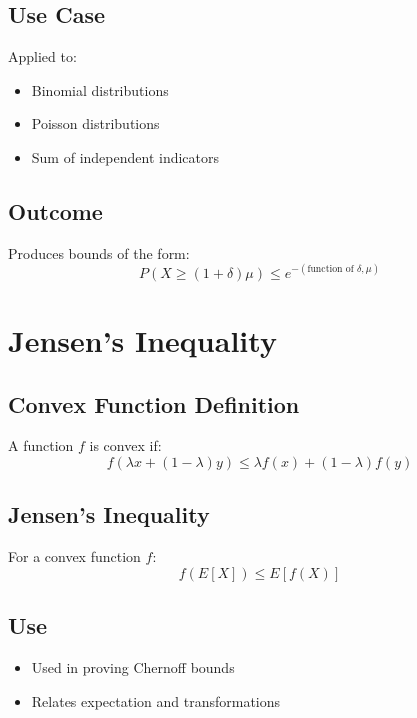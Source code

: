 \documentclass{article}
\begin{document}
\subsection{Use Case}

Applied to:
\begin{itemize}
    \item Binomial distributions
    \item Poisson distributions
    \item Sum of independent indicators
\end{itemize}

\subsection{Outcome}

Produces bounds of the form:
\begin{equation}
P(X \geq (1 + \delta)\mu) \leq e^{-(\text{function of } \delta, \mu)}
\end{equation}

\section{Jensen’s Inequality}

\subsection{Convex Function Definition}

A function $f$ is convex if:
\begin{equation}
f(\lambda x + (1 - \lambda)y) \leq \lambda f(x) + (1 - \lambda) f(y)
\end{equation}

\subsection{Jensen’s Inequality}

For a convex function $f$:
\begin{equation}
f(E[X]) \leq E[f(X)]
\end{equation}

\subsection{Use}

\begin{itemize}
    \item Used in proving Chernoff bounds
    \item Relates expectation and transformations
\end{itemize}
\end{document}
